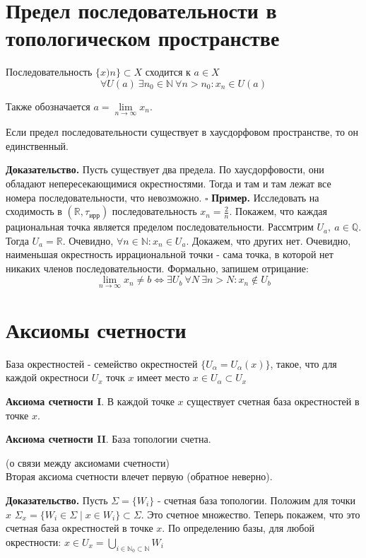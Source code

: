 \section{Предел последовательности в топологическом пространстве}
\begin{defin}
    Последовательность $\{x)n\}\subset X$ сходится к $a\in X$
$$\forall U(a)~\exists n_0\in \mathbb{N}~\forall n>n_0:x_n\in U(a)$$
\end{defin}
Также обозначается $a=\lim\limits_{n\to\infty}x_n$. 
\begin{theor}
Если предел последовательности существует в хаусдорфовом пространстве, 
то он единственный. 
\end{theor}
\textbf{Доказательство.}  Пусть существует два предела. По хаусдорфовости, 
они обладают непересекающимися окрестностями. Тогда и там и там лежат все 
номера последовательности, что невозможно. 
$\square$ 
\textbf{Пример.} Исследовать на сходимость в 
$(\mathbb{R},\tau_\text{ирр})$ последовательность $x_n=\frac{2}{n}$. 
Покажем, что каждая рациональная точка является пределом последовательности. 
Рассмтрим $U_a,~a\in \mathbb{Q}$. Тогда $U_a=\mathbb{R}$. Очевидно,
$\forall n\in \mathbb{N}:x_n\in U_a$. Докажем, что других нет. Очевидно,
наименьшая окрестность иррациональной точки - сама точка, в которой нет 
никаких членов последовательности. Формально, запишем отрицание:
$$\lim\limits_{n \to \infty} x_n\ne b\iff \exists U_b~\forall N~\exists n>N:
x_n\notin U_b$$ 
\section{Аксиомы счетности}
\begin{defin}
База окрестностей - семейство окрестностей $\{U_\alpha=U_\alpha(x)\}$, 
такое, что для каждой окрестноси $U_x$ точк $x$ имеет место
$x\in U_\alpha\subset U_x$
\end{defin}

\begin{defin}
\textbf{Аксиома счетности I}. В каждой точке $x$ существует счетная база
окрестностей в точке  $x$.
\end{defin}
\begin{defin}
\textbf{Аксиома счетности II}. База топологии счетна.
\end{defin}
\begin{theor}
    (о связи между аксиомами счетности)\\
    Вторая аксиома счетности влечет первую (обратное неверно).
\end{theor}
\textbf{Доказательство.} Пусть $\Sigma=\{W_i\}$ - счетная база топологии.
Положим для точки $x$  $\Sigma_x=\{W_i\in\Sigma\mid x\in W_i\}\subset\Sigma$.
Это счетное множество. Теперь покажем, что это счетная 
база окрестностей в точке
$x$. По определению базы, для любой окрестности: 
$x\in U_x=\bigcup\limits_{i\in \mathbb{N}_0\subset \mathbb{N}}W_i$

